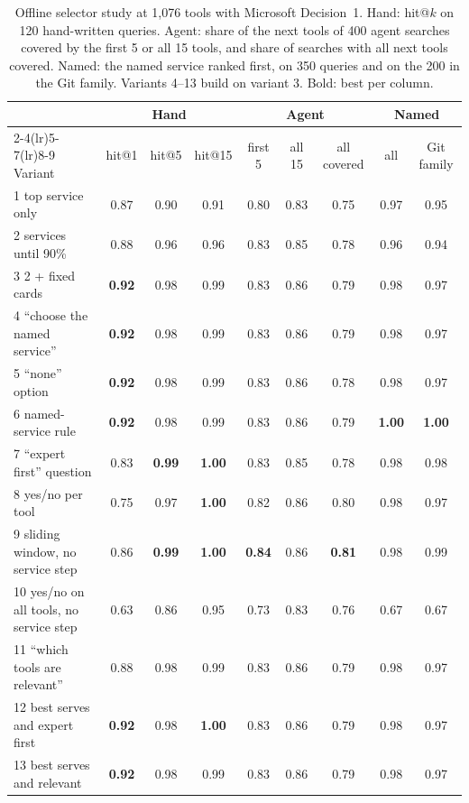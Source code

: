 \documentclass[11pt]{article}
\newcommand{\msd}{Microsoft Decision~1}
\begin{document}
\begin{table}[t]
\centering\footnotesize
\caption{Offline selector study at 1{,}076 tools with \msd{}. Hand: hit@$k$ on 120 hand-written queries. Agent: share
of the next tools of 400 agent searches covered by the first 5 or all 15 tools, and share of searches with all next
tools covered. Named: the named service ranked first, on 350 queries and on the 200 in the Git family. Variants 4--13 build on variant 3. Bold: best per column.}
\label{tab:study}
\setlength{\tabcolsep}{3.4pt}
\begin{tabular}{@{}l ccc ccc cc@{}}
\toprule
& \multicolumn{3}{c}{Hand} & \multicolumn{3}{c}{Agent} & \multicolumn{2}{c}{Named} \\
\cmidrule(lr){2-4}\cmidrule(lr){5-7}\cmidrule(lr){8-9}
Variant & hit@1 & hit@5 & hit@15 & first 5 & all 15 & all covered & all & Git family \\
\midrule
1 top service only & 0.87 & 0.90 & 0.91 & 0.80 & 0.83 & 0.75 & 0.97 & 0.95 \\
2 services until 90\% & 0.88 & 0.96 & 0.96 & 0.83 & 0.85 & 0.78 & 0.96 & 0.94 \\
3 2 + fixed cards & \textbf{0.92} & 0.98 & 0.99 & 0.83 & 0.86 & 0.79 & 0.98 & 0.97 \\
4 ``choose the named service'' & \textbf{0.92} & 0.98 & 0.99 & 0.83 & 0.86 & 0.79 & 0.98 & 0.97 \\
5 ``none'' option & \textbf{0.92} & 0.98 & 0.99 & 0.83 & 0.86 & 0.78 & 0.98 & 0.97 \\
6 named-service rule & \textbf{0.92} & 0.98 & 0.99 & 0.83 & 0.86 & 0.79 & \textbf{1.00} & \textbf{1.00} \\
7 ``expert first'' question & 0.83 & \textbf{0.99} & \textbf{1.00} & 0.83 & 0.85 & 0.78 & 0.98 & 0.98 \\
8 yes/no per tool & 0.75 & 0.97 & \textbf{1.00} & 0.82 & 0.86 & 0.80 & 0.98 & 0.97 \\
9 sliding window, no service step & 0.86 & \textbf{0.99} & \textbf{1.00} & \textbf{0.84} & 0.86 & \textbf{0.81} & 0.98 & 0.99 \\
10 yes/no on all tools, no service step & 0.63 & 0.86 & 0.95 & 0.73 & 0.83 & 0.76 & 0.67 & 0.67 \\
11 ``which tools are relevant'' & 0.88 & 0.98 & 0.99 & 0.83 & 0.86 & 0.79 & 0.98 & 0.97 \\
12 best serves and expert first & \textbf{0.92} & 0.98 & \textbf{1.00} & 0.83 & 0.86 & 0.79 & 0.98 & 0.97 \\
13 best serves and relevant & \textbf{0.92} & 0.98 & 0.99 & 0.83 & 0.86 & 0.79 & 0.98 & 0.97 \\
\bottomrule
\end{tabular}
\end{table}
\end{document}
